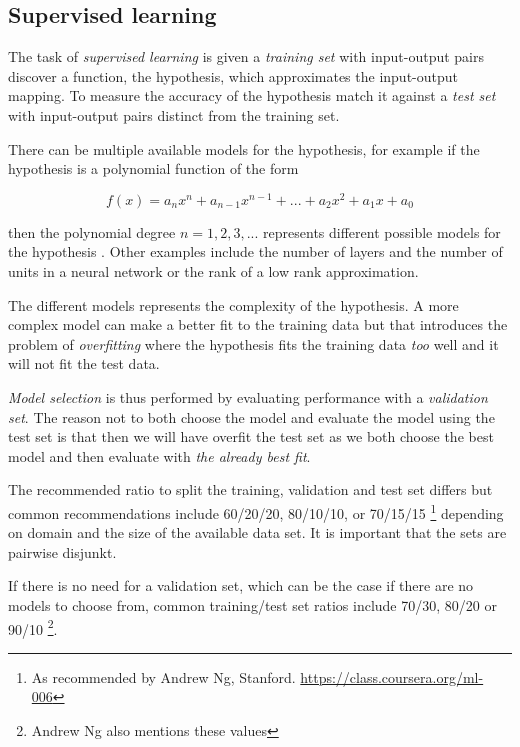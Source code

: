 
\subsection{Supervised learning}\label{sec:background:theory:suplearn}

The task of \textit{supervised learning} is given a \textit{training set} with input-output pairs discover a function, the hypothesis, which approximates the input-output mapping.  To measure the accuracy of the hypothesis match it against a \textit{test set} with input-output pairs distinct from the training set.
\citep{norvigAI}

There can be multiple available models for the hypothesis, for example if the hypothesis is a polynomial function of the form 

\begin{equation}
f(x) = a_n x^n + a_{n - 1} x^{n - 1} + ... + a_2 x^2 + a_1 x + a_0
\end{equation}

then the polynomial degree $n = 1, 2, 3, ...$ represents different possible models for the hypothesis \citep{norvigAI}. Other examples include the number of layers and the number of units in a neural network or the rank of a low rank approximation.

The different models represents the complexity of the hypothesis. A more complex model can make a better fit to the training data but that introduces the problem of \textit{overfitting} where the hypothesis fits the training data \textit{too} well and it will not fit the test data.
\citep{norvigAI}

\textit{Model selection} is thus performed by evaluating performance with a \textit{validation set}. The reason not to both choose the model and evaluate the model using the test set is that then we will have overfit the test set as we both choose the best model and then evaluate with \textit{the already best fit}. \citep{norvigAI}

The recommended ratio to split the training, validation and test set differs but common recommendations include 60/20/20, 80/10/10, or 70/15/15 \footnote{As recommended by Andrew Ng, Stanford. \url{https://class.coursera.org/ml-006}} depending on domain and the size of the available data set. It is important that the sets are pairwise disjunkt.

If there is no need for a validation set, which can be the case if there are no models to choose from, common training/test set ratios include 70/30, 80/20 or 90/10 \cite{hu2008collaborative, norvigAI} \footnote{Andrew Ng also mentions these values}.

